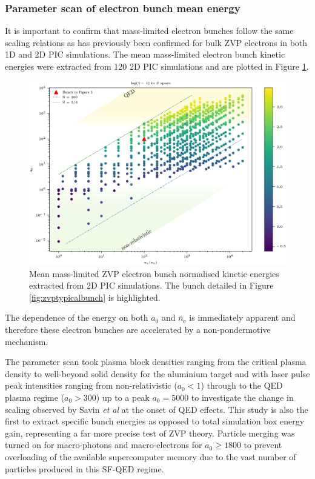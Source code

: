 \subsubsection{Parameter scan of electron bunch mean energy}
It is important to confirm that mass-limited electron bunches follow the same scaling relations as has previously been confirmed for bulk ZVP electrons in both 1D \cite{baevaZeroVectorPotential2011} and 2D \cite{savinAttosecondscaleAbsorptionExtreme2017} PIC simulations. The mean mass-limited electron bunch kinetic energies were extracted from 120 2D PIC simulations and are plotted in Figure \ref{fig:zvpmeangammas}. 
\begin{figure}
	\centering
	\includegraphics[width=1\linewidth]{figures/zvp/zvp_mean_gammas}
	\caption[Mean mass-limited ZVP electron bunch normalised kinetic energies extracted from 2D PIC simulations.]{Mean mass-limited ZVP electron bunch normalised kinetic energies extracted from 2D PIC simulations. The bunch detailed in Figure \ref{fig:zvptypicalbunch} is highlighted.}
	\label{fig:zvpmeangammas}
\end{figure}
The dependence of the energy on both $a_0$ and $\bar{n}_\mathrm{e}$ is immediately apparent and therefore these electron bunches are accelerated by a non-pondermotive mechanism. 

The parameter scan took plasma block densities ranging from the critical plasma density to well-beyond solid density for the aluminium target and with laser pulse peak intensities ranging from non-relativistic ($a_0 < 1$) through to the \ac{QED} plasma regime ($a_0 > 300$) up to a peak $a_0 = 5000$ to investigate the change in scaling observed by Savin \textit{et al} \cite{savinEnergyAbsorptionLaserQED2019} at the onset of QED effects. This study is also the first to extract specific bunch energies as opposed to total simulation box energy gain, representing a far more precise test of ZVP theory. Particle merging was turned on for macro-photons and macro-electrons for $a_0 \ge 1800$ to prevent overloading of the available supercomputer memory due to the vast number of particles produced in this SF-QED regime. 

